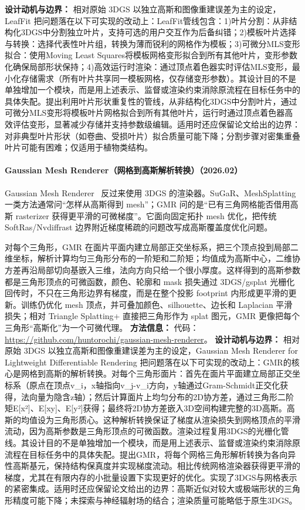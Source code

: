 \textbf{设计动机与边界：} 相对原始 3DGS 以独立高斯和图像重建误差为主的设定，LeafFit 把问题落在以下可实现的改动上：LeafFit管线包含：1)叶片分割：从非结构化3DGS中分割独立叶片，支持可选的用户交互作为后备纠错；2)模板叶片选择与转换：选择代表性叶片组，转换为薄而锐利的网格作为模板；3)可微分MLS变形拟合：使用Moving Least Squares将模板网格变形拟合到所有其他叶片，变形参数化确保局部形状保持；4)高效运行时渲染：通过顶点着色器实时评估MLS变形，最小化存储需求（所有叶片共享同一模板网格，仅存储变形参数）。其设计目的不是单独增加一个模块，而是用上述表示、监督或渲染约束消除原流程在目标任务中的具体失配。提出利用叶片形状重复性的管线，从非结构化3DGS中分割叶片，通过可微分MLS变形将模板叶片网格拟合到所有其他叶片，运行时通过顶点着色器高效评估变形，显著减少存储并支持参数级编辑。适用时还应保留论文给出的边界：对非典型叶片形状（如卷曲、受损叶片）拟合质量可能下降；分割步骤对密集重叠叶片可能有困难；仅适用于植物类结构。
\paragraph{Gaussian Mesh Renderer（网格到高斯解析转换）（2026.02）}
Gaussian Mesh Renderer~\cite{2602_14493} 反过来使用 3DGS 的渲染器。SuGaR、MeshSplatting 一类方法通常问“怎样从高斯得到 mesh”；GMR 问的是“已有三角网格能否借用高斯 rasterizer 获得更平滑的可微梯度”。它面向固定拓扑 mesh 优化，把传统 SoftRas/Nvdiffrast 边界附近梯度稀疏的问题改写成高斯覆盖度优化问题。

对每个三角形，GMR 在面片平面内建立局部正交坐标系，把三个顶点投到局部二维坐标，解析计算均匀三角形分布的一阶矩和二阶矩；均值成为高斯中心，二维协方差再沿局部切向基嵌入三维，法向方向只给一个很小厚度。这样得到的高斯参数都是三角形顶点的可微函数，颜色、轮廓和 mask 损失通过 3DGS/gsplat 光栅化回传时，不只在三角形边界有梯度，而是在整个投影 footprint 内形成更平滑的更新。训练仍优化 mesh 顶点，并可叠加颜色、silhouette、边长和 Laplacian 平滑损失；相对 Triangle Splatting+ 直接把三角形作为 splat 图元，GMR 更像把每个三角形“高斯化”为一个可微代理。
\textbf{方法信息：} 代码：\url{https://github.com/huntorochi/gaussian-mesh-renderer}。
\textbf{设计动机与边界：} 相对原始 3DGS 以独立高斯和图像重建误差为主的设定，Gaussian Mesh Renderer for Lightweight Differentiable Rendering 把问题落在以下可实现的改动上：GMR的核心是网格到高斯的解析转换。对每个三角形面片：首先在面片平面建立局部正交坐标系（原点在顶点v\_i，x轴指向v\_j-v\_i方向，y轴通过Gram-Schmidt正交化获得，法向量为隐含z轴）；然后计算面片上均匀分布的2D协方差，通过三角形二阶矩E[x²]、E[xy]、E[y²]获得；最终将2D协方差嵌入3D空间构建完整的3D高斯。高斯的均值设为三角形质心。这种解析转换保证了梯度从渲染损失到网格顶点的平滑流动，因为高斯参数是三角形顶点的可微函数。渲染过程复用3DGS的光栅化管线。其设计目的不是单独增加一个模块，而是用上述表示、监督或渲染约束消除原流程在目标任务中的具体失配。提出GMR，将每个网格三角形解析转换为各向异性高斯基元，保持结构保真度并实现梯度流动。相比传统网格渲染器获得更平滑的梯度，尤其在有限内存的小批量设置下实现更好的优化。实现了3DGS与网格表示的紧密集成。适用时还应保留论文给出的边界：高斯近似对较大或极端形状的三角形精度可能下降；未探索与神经辐射场的结合；渲染质量可能略低于原生3DGS。
